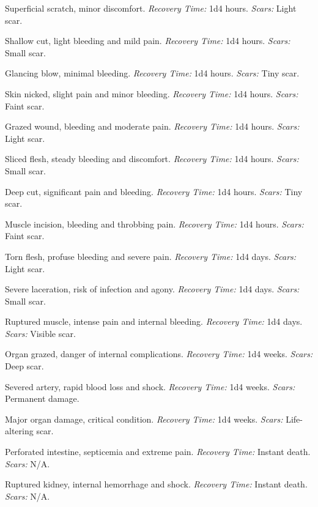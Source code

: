 \documentclass[12pt]{book}
\begin{document}
\begin{description}[labelwidth=1.5em, leftmargin=*, itemsep=0.4em]
    \item[1 -] Superficial scratch, minor discomfort. \textit{Recovery Time:} 1d4 hours. \textit{Scars:} Light scar.
    \item[2 -] Shallow cut, light bleeding and mild pain. \textit{Recovery Time:} 1d4 hours. \textit{Scars:} Small scar.
    \item[3 -] Glancing blow, minimal bleeding. \textit{Recovery Time:} 1d4 hours. \textit{Scars:} Tiny scar.
    \item[4 -] Skin nicked, slight pain and minor bleeding. \textit{Recovery Time:} 1d4 hours. \textit{Scars:} Faint scar.
    \item[5 -] Grazed wound, bleeding and moderate pain. \textit{Recovery Time:} 1d4 hours. \textit{Scars:} Light scar.
    \item[6 -] Sliced flesh, steady bleeding and discomfort. \textit{Recovery Time:} 1d4 hours. \textit{Scars:} Small scar.
    \item[7 -] Deep cut, significant pain and bleeding. \textit{Recovery Time:} 1d4 hours. \textit{Scars:} Tiny scar.
    \item[8 -] Muscle incision, bleeding and throbbing pain. \textit{Recovery Time:} 1d4 hours. \textit{Scars:} Faint scar.
    \item[9 -] Torn flesh, profuse bleeding and severe pain. \textit{Recovery Time:} 1d4 days. \textit{Scars:} Light scar.
    \item[10 -] Severe laceration, risk of infection and agony. \textit{Recovery Time:} 1d4 days. \textit{Scars:} Small scar.
    \item[11 -] Ruptured muscle, intense pain and internal bleeding. \textit{Recovery Time:} 1d4 days. \textit{Scars:} Visible scar.
    \item[12 -] Organ grazed, danger of internal complications. \textit{Recovery Time:} 1d4 weeks. \textit{Scars:} Deep scar.
    \item[13 -] Severed artery, rapid blood loss and shock. \textit{Recovery Time:} 1d4 weeks. \textit{Scars:} Permanent damage.
    \item[14 -] Major organ damage, critical condition. \textit{Recovery Time:} 1d4 weeks. \textit{Scars:} Life-altering scar.
    \item[15 -] Perforated intestine, septicemia and extreme pain. \textit{Recovery Time:} Instant death. \textit{Scars:} N/A.
    \item[16 -] Ruptured kidney, internal hemorrhage and shock. \textit{Recovery Time:} Instant death. \textit{Scars:} N/A.

\end{description}
\end{document}
